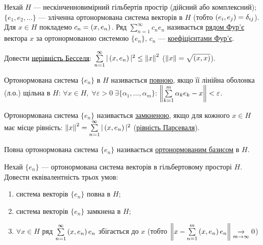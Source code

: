 
\begin{theory}
    Нехай $H$ --- нескінченновимірний гільбертів простір (дійсний або комплексний); 
    $\{e_1, e_2, ...\}$ --- зліченна ортонормована система векторів в $H$ (тобто $\left(e_i, e_j\right) 
    = \delta_{ij}$). Для $x \in H$ покладемо $c_n = \left(x, e_n\right)$. Ряд $\sum\limits_{n=1}^\infty 
    c_n e_n$ називається \underline{рядом Фур'є} вектора $x$ за ортонормованою системою 
    $\{e_n\}$, $c_n$ --- \underline{коефіцієнтами Фур'є}.
\end{theory}

\begin{exercise}
    Довести \underline{нерівність Бесселя}: $\sum\limits_{n=1}^\infty |\left(x, e_n\right)|^2 \leq 
    \left\lVert x\right\rVert^2$ ($\left\lVert x\right\rVert = \sqrt{\left(x, x\right)}$).
\end{exercise}

\begin{theory}
    
    Ортонормована система $\{e_n\}$ в $H$ називається \underline{повною}, якщо її лінійна 
    оболонка (л.о.) щільна в $H$:
     $\forall x \in H, \;\forall \varepsilon > 0 \; \exists \{\alpha_1, ..., 
    \alpha_m\}$: $\left\lVert\sum\limits_{k=1}^m \alpha_k e_k - x\right\rVert < \varepsilon$.

    Ортонормована система $\{e_n\}$ називається \underline{замкненою}, якщо для кожного 
    $x \in H$ має місце рівність: $\left\lVert x\right\rVert^2 = \sum\limits_{n=1}^\infty |\left(x, e_n\right)|^2$ 
    (\underline{рівність Парсеваля}).

    Повна ортонормована система $\{e_n\}$ називається \uline{ортонормованим 
    базисом} в $H$.
\end{theory}

\begin{exercise}
    Нехай $\{e_n\}$ --- ортонормована система векторів в гільбертовому просторі $H$. 
    Довести еквівалентність трьох умов:
    \begin{enumerate}[label=\ukr*)]
        \item система векторів $\{e_n\}$ повна в $H$;
        \item система векторів $\{e_n\}$ замкнена в $H$;
        \item $\forall x \in H$ ряд $\sum\limits_{n=1}^\infty \left(x, e_n\right)e_n$ збігається до $x$
        (тобто $\left\lVert x - \sum\limits_{n=1}^m \left(x, e_n\right)e_n\right\rVert
        \underset{m\rightarrow\infty}{\rightarrow}0$)
    \end{enumerate}
\end{exercise}

